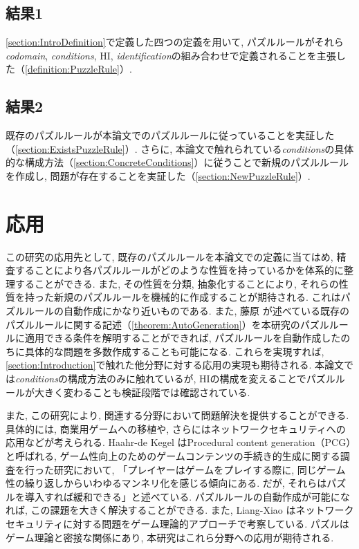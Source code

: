 \subsection*{結果1}
\cref{section:IntroDefinition}で定義した四つの定義を用いて, パズルルールがそれら\textit{codomain}, \textit{conditions}, HI, \textit{identification}の組み合わせで定義されることを主張した（\cref{definition:PuzzleRule}）.

\subsection*{結果2}
既存のパズルルールが本論文でのパズルルールに従っていることを実証した（\cref{section:ExistsPuzzleRule}）.
さらに, 本論文で触れられている\textit{conditions}の具体的な構成方法（\cref{section:ConcreteConditions}）に従うことで新規のパズルルールを作成し, 問題が存在することを実証した（\cref{section:NewPuzzleRule}）.

\section{応用}
この研究の応用先として, 既存のパズルルールを本論文での定義に当てはめ, 精査することにより各パズルルールがどのような性質を持っているかを体系的に整理することができる. また, その性質を分類, 抽象化することにより, それらの性質を持った新規のパズルルールを機械的に作成することが期待される. これはパズルルールの自動作成にかなり近いものである. また, 藤原 \cite{Fujiwara2022}が述べている既存のパズルルールに関する記述（\cref{theorem:AutoGeneration}）を本研究のパズルルールに適用できる条件を解明することができれば, パズルルールを自動作成したのちに具体的な問題を多数作成することも可能になる. これらを実現すれば, \cref{section:Introduction}で触れた他分野に対する応用の実現も期待される.
本論文では\textit{conditions}の構成方法のみに触れているが, HIの構成を変えることでパズルルールが大きく変わることも検証段階では確認されている.

また, この研究により, 関連する分野において問題解決を提供することができる. 具体的には, 商業用ゲームへの移植や, さらにはネットワークセキュリティへの応用などが考えられる. Haahr-de Kegel \cite{Barbara2020}はProcedural content generation（PCG）と呼ばれる, ゲーム性向上のためのゲームコンテンツの手続き的生成に関する調査を行った研究において, 「プレイヤーはゲームをプレイする際に, 同じゲーム性の繰り返しからいわゆるマンネリ化を感じる傾向にある. だが, それらはパズルを導入すれば緩和できる」と述べている. パズルルールの自動作成が可能になれば, この課題を大きく解決することができる. また, Liang-Xiao \cite{Liang2013}はネットワークセキュリティに対する問題をゲーム理論的アプローチで考察している. パズルはゲーム理論と密接な関係にあり, 	本研究はこれら分野への応用が期待される.
